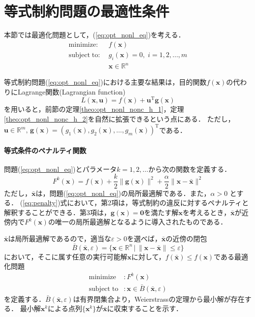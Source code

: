 \documentclass{jsreport}
\begin{document}
\section{等式制約問題の最適性条件}
本節では最適化問題として，(\ref{eq:opt_nonl_eq})を考える．
\begin{align}\label{eq:opt_nonl_eq}
  \mathrm{minimize} : \; &f(\bm{x}) \nonumber\\
  \mathrm{subject \; to} : \; &g_i(\bm{x}) = 0, \; i = 1, 2, \ldots, m \nonumber \\
  &\bm{x} \in \mathbb{R}^n
\end{align}

等式制約問題(\ref{eq:opt_nonl_eq})における主要な結果は，目的関数$f(\bm{x})$の代わりにLagrange関数(Lagrangian function)
\begin{equation}\label{eq:lag}
  L(\bm{x}, \bm{u}) = f(\bm{x}) + \bm{u}^{\mathrm{T}} \bm{g}(\bm{x})
\end{equation}
を用いると，前節の定理\ref{theo:opt_nonl_nonc_h_1}，定理\ref{theo:opt_nonl_nonc_h_2}を自然に拡張できるという点にある．
ただし，$\bm{u} \in \mathbb{R}^m, \, \bm{g}(\bm{x}) = (g_1(\bm{x}), g_2(\bm{x}), \ldots, g_m(\bm{x}))^{\mathrm{T}}$である．

\paragraph{等式条件のペナルティ関数}
問題(\ref{eq:opt_nonl_eq})とパラメータ$k = 1, 2, \ldots$から次の関数を定義する．
\begin{equation}\label{eq:penalty}
  F^k(\bm{x}) = f(\bm{x}) + \frac{k}{2}\|\bm{g}(\bm{x})\|^2 + \frac{\alpha}{2}\|\bm{x} - \bar{\bm{x}}\|^2
\end{equation}
ただし，$\bar{\bm{x}}$は，問題(\ref{eq:opt_nonl_eq})の局所最適解である．また，$\alpha > 0$
とする．
(\ref{eq:penalty})式において，第2項は，等式制約の違反に対するペナルティと解釈することができる．第3項は，$\bm{g}(\bm{x}) = \bm{0}$を満たす解$\bm{x}$を考えるとき，$\bar{\bm{x}}$が近傍内で$F^k(\bm{x})$の唯一の局所最適解となるように導入されたものである．

$\bar{\bm{x}}$は局所最適解であるので，適当な$\varepsilon > 0$を選べば，$\bar{\bm{x}}$の近傍の閉包
\begin{equation}
  \bar{B}(\bar{\bm{x}}, \varepsilon) = \{\bm{x} \in \mathbb{R}^n \, | \, \|\bm{x} - \bar{\bm{x}}\| \leq \varepsilon\}
\end{equation}
において，そこに属す任意の実行可能解$\bm{x}$に対して，$f(\bar{\bm{x}}) \leq f(\bm{x})$である最適化問題
\begin{align}\label{eq:opt_penal}
  \mathrm{minimize} &: F^k(\bm{x}) \nonumber\\
  \mathrm{subject \; to} &: \bm{x} \in \bar{B}(\bar{\bm{x}}, \varepsilon)
\end{align}
を定義する．$\bar{B}(\bar{\bm{x}}, \varepsilon)$は有界閉集合より，Weierstrassの定理から最小解が存在する．
最小解$\bm{x}^k$による点列$\{\bm{x}^k\}$が$\bar{\bm{x}}$に収束することを示す．
\end{document}
